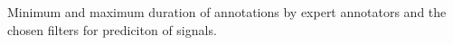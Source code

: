 \documentclass[11pt]{article}
\begin{document}
\pagestyle{empty}
\begin{table}[h]
    \centering
    \caption{Minimum and maximum duration of annotations by expert annotators and the chosen filters for prediciton of signals.}
    \small
    
\end{table}
\end{document}
